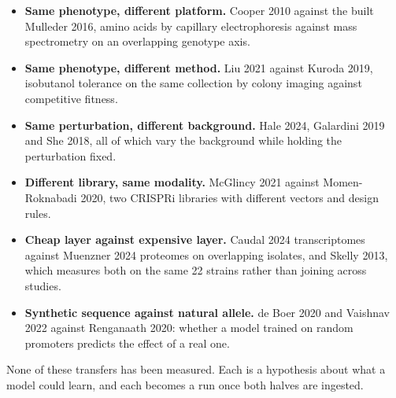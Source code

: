 \begin{itemize}[leftmargin=1.2em,itemsep=1pt,topsep=2pt]
  \item \textbf{Same phenotype, different platform.} Cooper 2010 against the built
    Mulleder 2016, amino acids by capillary electrophoresis against mass spectrometry on an
    overlapping genotype axis.
  \item \textbf{Same phenotype, different method.} Liu 2021 against Kuroda 2019, isobutanol
    tolerance on the same collection by colony imaging against competitive fitness.
  \item \textbf{Same perturbation, different background.} Hale 2024, Galardini 2019 and
    She 2018, all of which vary the background while holding the perturbation fixed.
  \item \textbf{Different library, same modality.} McGlincy 2021 against
    Momen-Roknabadi 2020, two CRISPRi libraries with different vectors and design rules.
  \item \textbf{Cheap layer against expensive layer.} Caudal 2024 transcriptomes against
    Muenzner 2024 proteomes on overlapping isolates, and Skelly 2013, which measures both on
    the same 22 strains rather than joining across studies.
  \item \textbf{Synthetic sequence against natural allele.} de Boer 2020 and Vaishnav 2022
    against Renganaath 2020: whether a model trained on random promoters predicts the effect
    of a real one.
\end{itemize}

None of these transfers has been measured. Each is a hypothesis about what a model could
learn, and each becomes a run once both halves are ingested.
